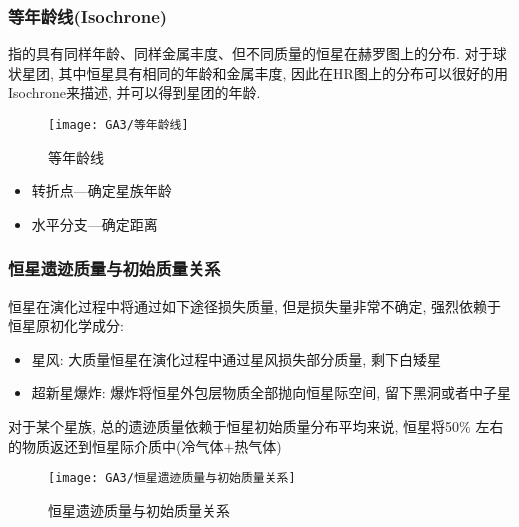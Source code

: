 


\subsubsection{等年龄线(Isochrone)}
指的具有同样年龄、同样金属丰度、但不同质量的恒星在赫罗图上的分布. 对于球状星团, 其中恒星具有相同的年龄和金属丰度, 因此在HR图上的分布可以很好的用Isochrone来描述, 并可以得到星团的年龄. 

\begin{figure}[!htb]
    \centering
    \texttt{[image: GA3/等年龄线]}
    \caption{等年龄线}
\end{figure}
\begin{itemize}
    \item 转折点---确定星族年龄
    \item 水平分支---确定距离
\end{itemize}

\subsubsection{恒星遗迹质量与初始质量关系}
恒星在演化过程中将通过如下途径损失质量, 但是损失量非常不确定, 强烈依赖于恒星原初化学成分:
\begin{itemize}\small
    \item 星风: 大质量恒星在演化过程中通过星风损失部分质量, 剩下白矮星
    \item 超新星爆炸: 爆炸将恒星外包层物质全部抛向恒星际空间, 留下黑洞或者中子星
\end{itemize}

对于某个星族, 总的遗迹质量依赖于恒星初始质量分布平均来说, 恒星将50\% 左右的物质返还到恒星际介质中(冷气体+热气体)

\begin{figure}[!htb]
    \centering
    \texttt{[image: GA3/恒星遗迹质量与初始质量关系]}
    \caption{恒星遗迹质量与初始质量关系}
\end{figure}


